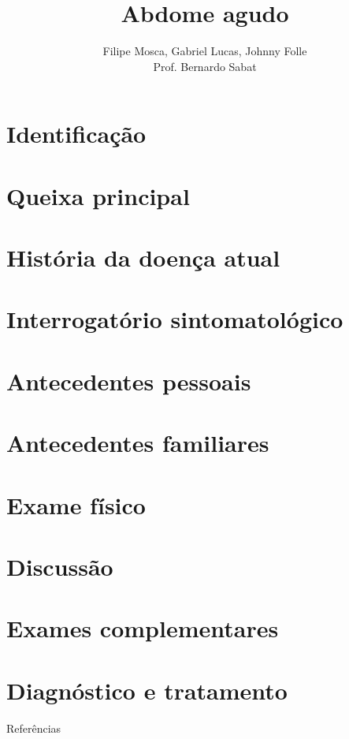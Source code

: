 \documentclass[13pt]{beamer}
\title[Apresentação de DC]{Abdome agudo}
\author[FCM]{Filipe Mosca, Gabriel Lucas, Johnny Folle \\
Prof. Bernardo Sabat}
\begin{document}


\section{Identificação} 


\section{Queixa principal}


\section{História da doença atual}


\section{Interrogatório sintomatológico}


\section{Antecedentes pessoais}


\section{Antecedentes familiares}


\section{Exame físico}


\section{Discussão}


\section{Exames complementares}


\section{Diagnóstico e tratamento}




\nocite{*}
\begin{frame}{Referências}


\end{frame}


\begin{frame}
\titlepage 
\end{frame}
\end{document}
